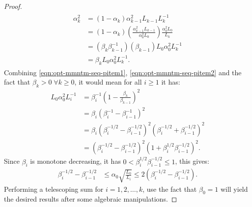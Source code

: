 \documentclass[12pt]{article}
\begin{document}
\begin{proof}
\begin{align}
\begin{split}
                \alpha_k^2&= (1 - \alpha_k)\alpha_{k - 1}^2L_{k - 1}L_k^{-1}
                \\
                &= 
                (1 - \alpha_k)
                \left(
                    \frac{\alpha_{k - 1}^2L_{k - 1}}{\alpha_0^2L_0}
                \right)
                \frac{\alpha_0^2L_0}{L_k}
                \\
                &= 
                (\beta_k\beta_{k - 1}^{-1})\left(
                    \beta_{k - 1}
                \right)L_0\alpha_0^2L_k^{-1}
                \\
                &= \beta_kL_0\alpha_0^2L_k^{-1}.         
            \end{split}\end{align}
            Combining \eqref{eqn:opt-mmntm-seq-pitem1}, \eqref{eqn:opt-mmntm-seq-pitem2} and the fact that $\beta_k > 0\;\forall k \ge 0$, it would mean for all $i \ge 1$ it has: 
            \begin{align*}
                L_0 \alpha_0^2 L_i^{-1} &= 
                \beta_i^{-1}\left(
                    1 - \frac{\beta_k}{\beta_{k - 1}}
                \right)^2
                \\
                &= 
                \beta_i \left(
                    \beta_i^{-1} - \beta_{i - 1}^{-1}
                \right)^2
                \\
                &=
                \beta_i \left(
                    \beta_i^{-1/2} - \beta_{i - 1}^{-1/2}
                \right)^2
                \left(
                    \beta_i^{-1/2} + \beta_{i - 1}^{-1/2}
                \right)^2
                \\
                &= \left(
                    \beta_i^{-1/2} - \beta_{i - 1}^{-1/2}
                \right)^2\left(
                    1 + \beta_i^{1/2}\beta_{i - 1}^{-1/2}
                \right)^2. 
            \end{align*}
            Since $\beta_i$ is monotone decreasing, it has $0 < \beta_i^{1/2}\beta_{i - 1}^{-1/2} \le 1$, this gives: 
            \begin{align*}
                \beta_i^{-1/2} - \beta_{i - 1}^{-1/2} 
                &\le \alpha_0\sqrt{\frac{L_0}{L_i}} 
                \le 2 \left(
                    \beta_i^{-1/2} - \beta_{i - 1}^{-1/2}
                \right).
            \end{align*}
            Performing a telescoping sum for $i = 1, 2, \ldots, k$, use the fact that $\beta_0 = 1$ will yield the desired results after some algebraic manipulations. 
        \end{proof}
\end{document}
